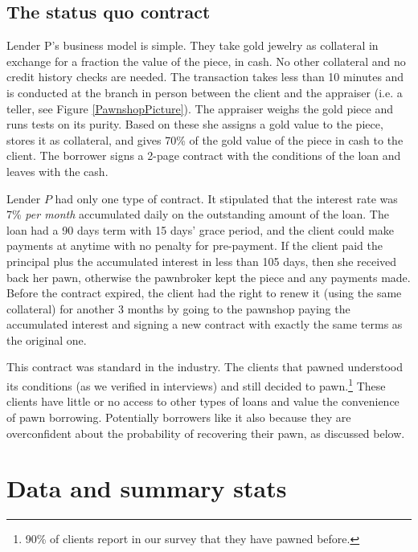 \documentclass[oneside,11pt]{article}
\begin{document}
\subsection{The status quo contract}

Lender P's business model is simple. They take gold jewelry as collateral in exchange for a fraction the value of the piece, in cash. No other collateral and no credit history checks are needed. The transaction takes less than 10 minutes and is conducted at the branch in person between the client and the appraiser (i.e. a teller, see Figure \ref{PawnshopPicture}). The appraiser weighs the gold piece and runs tests on its purity. Based on these she assigns a gold value to the piece, stores it as collateral, and gives 70\% of the gold value of the piece in cash to the client. The borrower signs a 2-page contract with the conditions of the loan and leaves with the cash.

Lender $P$ had only one type of contract. It stipulated that the interest rate was 7\% \textit{per month} accumulated daily on the outstanding amount of the loan. The loan had a 90 days term with 15 days' grace period, and the client could make payments at anytime with no penalty for pre-payment. If the client paid the principal plus the accumulated interest in less than 105 days, then she received back her pawn, otherwise the pawnbroker kept the piece and any payments made. Before the contract expired, the client had the right to renew it (using the same collateral) for another 3 months by going to the pawnshop paying the accumulated interest and signing a new contract with exactly the same terms as the original one. %

This contract was standard in the industry. The clients that pawned understood its conditions (as we verified in interviews) and still decided to pawn.\footnote{90\% of clients report in our survey that they have pawned before.} These clients have little or no access to other types of loans and value the convenience of pawn borrowing. Potentially borrowers like it also because they are overconfident about the probability of recovering their pawn, as discussed below.

    
\section{Data and summary stats} \label{Data}
    
\end{document}
